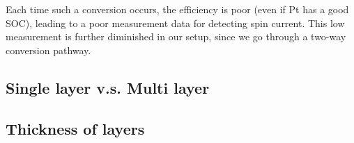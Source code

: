 Each time such a conversion occurs, the efficiency is poor (even if Pt has a good SOC), leading to a poor measurement data for detecting spin current. This low measurement is further diminished in our setup, since we go through a two-way conversion pathway.

\subsection{Single layer v.s. Multi layer}


\subsection{Thickness of layers}

